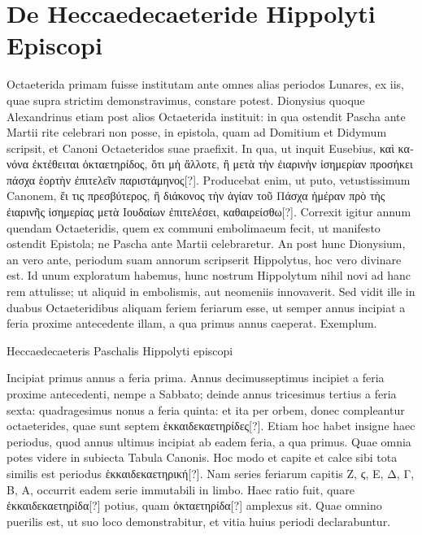 \section{De Heccaedecaeteride Hippolyti Episcopi}
%
Octaeterida primam fuisse institutam ante omnes alias
periodos Lunares, ex iis, quae supra strictim demonstravimus,
constare potest.
Dionysius quoque Alexandrinus etiam
post alios Octaeterida instituit: in qua ostendit Pascha ante 
Martii rite celebrari non posse, in epistola, quam ad Domitium et
Didymum scripsit, et Canoni Octaeteridos suae praefixit.
In qua, ut
inquit Eusebius, \textgreek{καὶ κανόνα ἐκτέθειται ὀκταετηρίδος, ὅτι μὴ ἄλλοτε,
ἢ μετὰ τὴν ἐιαρινὴν ἰσημερίαν προσήκει πάσχα ἑορτὴν ἐπιτελεῖν παριστάμηνος[?]}.
Producebat enim, ut puto, vetustissimum Canonem,
 \textgreek{ἔι τις πρεσβύτερος,
ἢ διάκονος τὴν ἁγίαν τοῦ Πάσχα ἡμέραν πρὸ τὴς ἐιαρινῆς ἰσημερίας
μετὰ Ιουδαίων ἐπιτελέσει, καθαιρείσθω[?]}.
Correxit igitur annum quendam
Octaeteridis, quem ex communi embolimaeum fecit, ut manifesto
ostendit Epistola; ne Pascha ante  Martii celebraretur.
An post hunc Dionysium, an vero ante, periodum suam
 annorum scripserit Hippolytus, hoc vero divinare est.
Id
unum exploratum habemus, hunc nostrum Hippolytum nihil novi
ad hanc rem attulisse; ut aliquid in embolismis, aut neomeniis innovaverit.
Sed vidit ille in duabus Octaeteridibus aliquam feriem
feriarum esse, ut semper  annus incipiat a feria proxime antecedente
illam, a qua primus annus caeperat.
Exemplum.
%
\begin{table}[tb]
  \centering
  
  \caption{Heccaedecaeteris Paschalis Hippolyti episcopi}
  \label{tab:p153}
\end{table}
%
Incipiat primus
annus a feria prima.
Annus decimusseptimus incipiet a feria proxime
antecedenti, nempe a Sabbato; deinde annus tricesimus tertius
a feria sexta: quadragesimus nonus a feria quinta: et ita per orbem,
donec compleantur  octaeterides, quae sunt septem
 \textgreek{ἑκκαιδεκαετηρίδες[?]}.
%
Etiam hoc habet insigne haec periodus, quod annus
ultimus incipiat ab eadem feria, a qua primus.
Quae omnia potes
videre in subiecta Tabula Canonis.
Hoc modo et capite et calce sibi
tota similis est periodus \textgreek{ἑκκαιδεκαετηρική[?]}.
Nam series feriarum capitis
\textgreek{Ζ, ϛ, Ε, Δ, Γ, Β, Α,} occurrit eadem serie immutabili in limbo.
Haec ratio fuit, quare \textgreek{ἑκκαιδεκαετηρίδα[?]} potius, quam
 \textgreek{ὀκταετηρίδα[?]}
amplexus sit.
Quae omnino puerilis est, ut suo loco demonstrabitur,
et vitia huius periodi declarabuntur.
%
%
%
